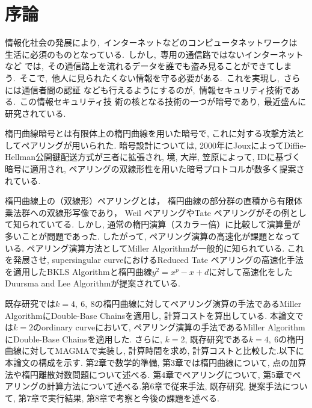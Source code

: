 \chapter{序論}
情報化社会の発展により,\ インターネットなどのコンピュータネットワークは
生活に必須のものとなっている.\ しかし,\ 専用の通信路ではないインターネットなど
では,\ その通信路上を流れるデータを誰でも盗み見ることができてしまう.\ そこで,\
他人に見られたくない情報を守る必要がある.\ これを実現し,\ さらには通信者間の認証
なども行えるようにするのが,\ 情報セキュリティ技術である.\ この情報セキュリティ技
術の核となる技術の一つが暗号であり,\ 最近盛んに研究されている.\

\bigskip

\par
楕円曲線暗号とは有限体上の楕円曲線を用いた暗号で, これに対する攻撃方法としてペアリングが用いられた. 暗号設計については, 2000年にJouxによってDiffie-Hellman公開鍵配送方式が三者に拡張され, 境, 大岸, 笠原によって, IDに基づく暗号に適用され, ペアリングの双線形性を用いた暗号プロトコルが数多く提案されている. \par
楕円曲線上の（双線形）ペアリングとは，
楕円曲線の部分群の直積から有限体乗法群への双線形写像であり，
Weil ペアリングやTate ペアリングがその例として知られていてる. しかし, 通常の楕円演算（スカラー倍）に比較して演算量が多いことが問題であった.
したがって, ペアリング演算の高速化が課題となっている. ペアリング演算方法としてMiller Algorithmが一般的に知られている. これを発展させ, supersingular curveにおけるReduced Tate ペアリングの高速化手法を適用したBKLS Algorithmと楕円曲線$y^2 = x^p - x + d$に対して高速化をしたDuursma and Lee Algorithmが提案されている.

\bigskip

\par
既存研究では$k=4,\ 6,\ 8$の楕円曲線に対してペアリング演算の手法であるMiller AlgorithmにDouble-Base Chainsを適用し, 計算コストを算出している. 本論文では$k=2$のordinary curveにおいて, ペアリング演算の手法であるMiller AlgorithmにDouble-Base Chainsを適用した. さらに, $k=2$, 既存研究である$k=4,\ 6$の楕円曲線に対してMAGMAで実装し, 計算時間を求め, 計算コストと比較した.以下に本論文の構成を示す. 第2章で数学的準備, 第3章では楕円曲線について, 点の加算法や楕円離散対数問題について述べる. 第4章でペアリングについて, 第5章でペアリングの計算方法について述べる.第6章で従来手法, 既存研究, 提案手法について, 第7章で実行結果, 第8章で考察と今後の課題を述べる.

